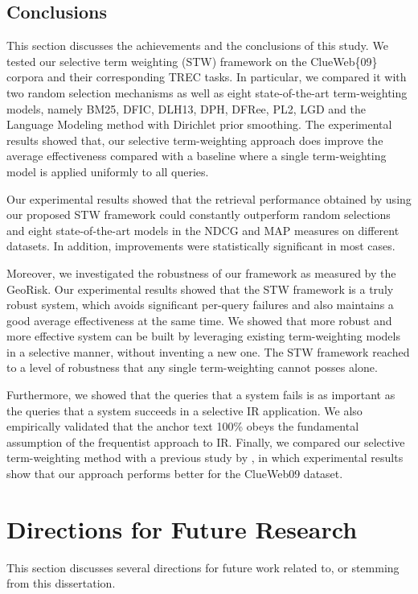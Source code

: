 \subsection{Conclusions}
This section discusses the achievements and the conclusions of this study.
We tested our selective term weighting (STW) framework on the ClueWeb\{09\} corpora and their corresponding TREC tasks.
In particular, we compared it with two random selection mechanisms as well as eight state-of-the-art term-weighting models, namely BM25, DFIC, DLH13, DPH, DFRee, PL2, LGD and the Language Modeling method with Dirichlet prior smoothing.
The experimental results showed that, our selective term-weighting approach does improve the average effectiveness compared with a baseline where a single term-weighting model is applied uniformly to all queries.

Our experimental results showed that the retrieval performance obtained by using our proposed STW framework could constantly outperform random selections and eight state-of-the-art models in the NDCG and MAP measures on different datasets. 
In addition, improvements were statistically significant in most cases.

Moreover, we investigated the robustness of our framework as measured by the GeoRisk.
Our experimental results showed that the STW framework is a truly robust system, which avoids significant per-query failures and also maintains a good average effectiveness at the same time.
We showed that more robust and more effective system can be built by leveraging existing term-weighting models in a selective manner, without inventing a new one.
The STW framework reached to a level of robustness that any single term-weighting cannot posses alone.

Furthermore, we showed that the queries that a system fails is as important as the queries that a system succeeds in a selective IR application.
We also empirically validated that the anchor text 100\% obeys the fundamental assumption of the frequentist approach to IR.
Finally, we compared our selective term-weighting method with a previous study by \citet{ModelSelection}, in which experimental results show that our approach performs better for the ClueWeb09 dataset. 

\section{Directions for Future Research}
This section discusses several directions for future work related to, or stemming from this dissertation.

